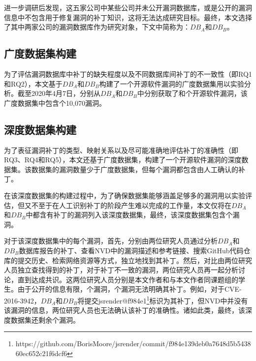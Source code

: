 进一步调研后发现，这五家公司中某些公司并未公开漏洞数据库，或是公开的漏洞信息中不包含用于修复漏洞的补丁知识，这将无法达成研究目标。最终，本文选择了其中两家公司的漏洞数据库作为研究对象，下文中简称为：$DB_A$和$DB_B$。


\subsection{广度数据集构建}
为了评估漏洞数据库中补丁的缺失程度以及不同数据库间补丁的不一致性（即RQ1和RQ2），本文基于$DB_A$和$DB_B$构建了一个开源软件漏洞的广度数据集用以实验分析。截至2020年4月7日，分别从$DB_A$和$DB_B$中分别获取了和个开源软件漏洞，该广度数据集中包含个10,070漏洞。

\subsection{深度数据集构建}
为了表征漏洞补丁的类型、映射关系以及尽可能准确地评估补丁的准确性（即RQ3、RQ4和RQ5），本文还基于广度数据集，构建了一个开源软件漏洞的深度数据集。该数据集的漏洞数量少于广度数据集，但每个漏洞都包含由人工确认的补丁。%

在该深度数据集的构建过程中，为了确保数据集能够涵盖足够多的漏洞用以实验评估，但又不至于在人工识别补丁的阶段产生难以完成的工作量，本文仅将在$DB_A$和$DB_B$中都含有补丁的漏洞列入该深度数据集，最终，该深度数据集包含个漏洞。

对于该深度数据集中的每个漏洞，首先，分别由两位研究人员通过分析$DB_A$和$DB_B$数据库报告的补丁、查看NVD中的漏洞描述和参考链接、搜索GitHub代码仓库的提交历史、检索网络资源等方式，独立地找到其补丁。然后，对比由两位研究人员独立查找得到的补丁，对于补丁不一致的漏洞，两位研究人员再一起分析讨论，直到达成共识。这两位研究人员分别是本文作者和与本文作者同课题组的学生。由于公开的信息有限，个漏洞，个漏洞无法明确其补丁。例如，对于CVE-2016-3942，$DB_A$和$DB_B$将提交jsrender@f984e1\footnote{https://github.com/BorisMoore/jsrender/commit/f984e139deb0a7648d5b543860ec652c21f6dcf6}标识为其补丁，但NVD中并没有该漏洞的信息，两位研究人员也无法确认该补丁的准确性。诸如此类，最终，该深度数据集还剩余个漏洞。

